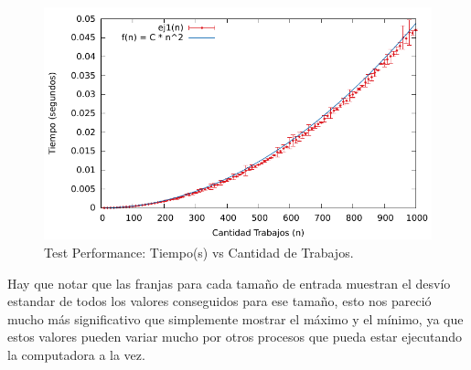 \begin{figure}[H]
\centering
\includegraphics{imgs/ej1_1000_10_100.pdf}
\caption{Test Performance: Tiempo(s) vs Cantidad de Trabajos.}
\end{figure}

\par{Hay que notar que las franjas para cada tamaño de entrada muestran el desvío estandar de todos los valores conseguidos para ese tamaño, esto nos pareci\'o mucho m\'as significativo que simplemente mostrar el máximo y el m\'inimo, ya que estos valores pueden variar mucho por otros procesos que pueda estar ejecutando la computadora a la vez.}
